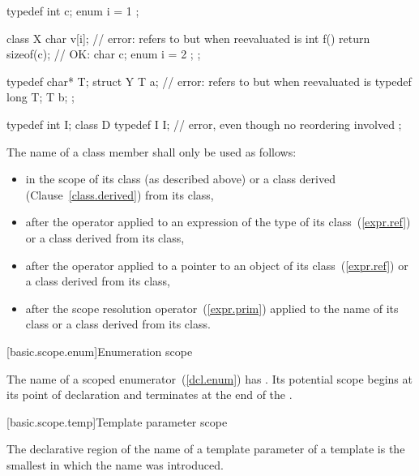 \pnum
\begin{example}
\begin{codeblock}
typedef int  c;
enum { i = 1 };

class X {
  char  v[i];                       // error:  refers to  but when reevaluated is 
  int  f() { return sizeof(c); }    // OK: 
  char  c;
  enum { i = 2 };
};

typedef char*  T;
struct Y {
  T  a;                             // error:  refers to  but when reevaluated is 
  typedef long  T;
  T  b;
};

typedef int I;
class D {
  typedef I I;                      // error, even though no reordering involved
};
\end{codeblock}
\end{example}

\pnum
The name of a class member shall only be used as follows:
\begin{itemize}
\item in the scope of its class (as described above) or a class derived
(Clause~\ref{class.derived}) from its class,
\item after the  operator applied to an expression of the type
of its class~(\ref{expr.ref}) or a class derived from its class,
\item after the \tcode{->} operator applied to a pointer to an object of
its class~(\ref{expr.ref}) or a class derived from its class,
\item after the \tcode{::} scope resolution operator~(\ref{expr.prim})
applied to the name of its class or a class derived from its class.
\end{itemize}

[basic.scope.enum]{Enumeration scope}%
%

\pnum
The name of a scoped enumerator~(\ref{dcl.enum}) has
. Its potential scope begins at
its point of declaration and terminates at the end of the
.

[basic.scope.temp]{Template parameter scope}%
%
%

\pnum
The declarative region of the name of a template parameter of a template
 is the smallest 
in which the name was introduced.

